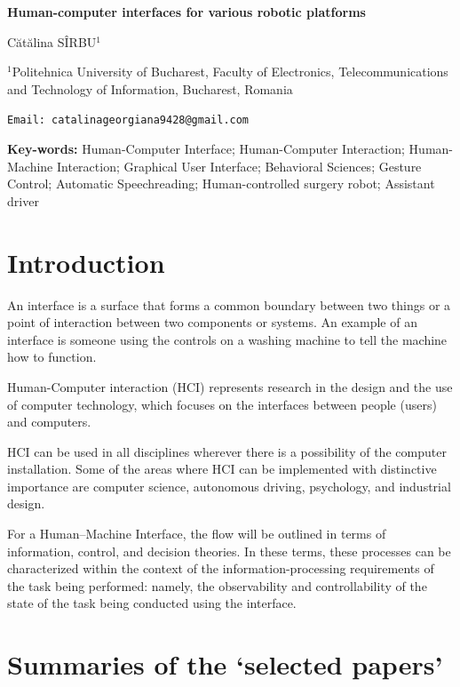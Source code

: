 \documentclass[12pt, twoside]{article}
\begin{document}
	\begin{center}
	\begin{huge}
	
	\textbf{Human-computer interfaces for various robotic platforms}
	\end{huge}
	
	\begin{large}
		Cătălina SÎRBU$^1$
	\end{large}
	
	
	\small {$^1$Politehnica University of Bucharest, Faculty of Electronics, Telecommunications and Technology of Information, Bucharest, Romania}
	
	\texttt {Email: catalinageorgiana9428@gmail.com}
	
	\textbf{Key-words:} Human-Computer Interface; Human-Computer Interaction; Human-Machine Interaction; Graphical User Interface; Behavioral Sciences; Gesture Control; Automatic Speechreading; Human-controlled surgery robot; Assistant driver
	\end{center}

\section{Introduction}

An interface is a surface that forms a common boundary between two things or a point of interaction between two components or systems. An example of an interface is someone using the controls on a washing machine to tell the machine how to function.

Human-Computer interaction (HCI) represents research in the design and the use of computer technology, which focuses on the interfaces between people (users) and computers.

HCI can be used in all disciplines wherever there is a possibility of the computer installation. Some of the areas where HCI can be implemented with distinctive importance are computer science, autonomous driving, psychology, and industrial design. 

For a Human–Machine Interface, the flow will be outlined in terms of information, control, and decision theories. In these terms, these processes can be characterized within the context of the information-processing requirements of the task being performed: namely, the observability and controllability of the state of the task being conducted using the interface.

\section{Summaries of the ‘selected papers’}
\end{document}
